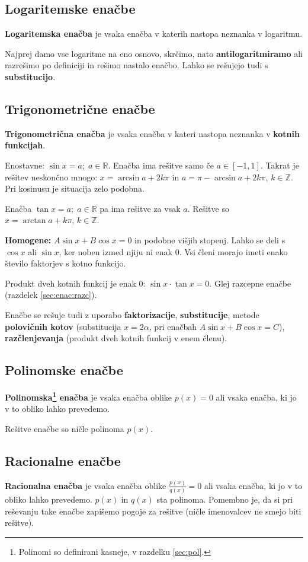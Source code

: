 \documentclass[a4paper,oneside,12pt,fleqn]{article}
\def\R{\ensuremath{\mathbb R}}
\def\Z{\ensuremath{\mathbb Z}}
\newcommand\krat\cdot
\def\kos{\cos}
\numberwithin{equation}{section}
\begin{document}
\subsection{Logaritemske enačbe}
\label{sec:enac:log}
\textbf{Logaritemska enačba} je vsaka enačba v katerih nastopa neznanka v logaritmu.

Najprej damo vse logaritme na eno osnovo, skrčimo, nato \textbf{antilogaritmiramo} ali razrešimo po
definiciji in rešimo nastalo enačbo. Lahko se rešujejo tudi s \textbf{substitucijo}.

\subsection{Trigonometrične enačbe}
\label{sec:enac:trig}
\textbf{Trigonometrična enačba} je vsaka enačba v kateri nastopa neznanka v \textbf{kotnih funkcijah}.

Enostavne: $\sin x = a; \; a \in \R$. 
Enačba ima rešitve samo če $a \in [-1,1]$. Takrat je rešitev neskončno mnogo:
$x = \arcsin a + 2k\pi$ in $a = \pi - \arcsin a + 2k\pi,\, k \in \Z$. Pri kosinusu je situacija zelo
podobna.

Enačba $\tan x = a; \; a \in \R$ pa ima rešitve za vsak $a$. Rešitve so $x = \arctan a + k\pi, \, k
\in \Z$.


\textbf{Homogene:} $A\sin x + B\kos x = 0$ in podobne višjih stopenj. Lahko se deli s $\kos x$ ali
$\sin x$, ker noben izmed njiju ni enak 0. Vsi členi morajo imeti enako število faktorjev
s kotno funkcijo.

Produkt dveh kotnih funkcij je enak 0: $\sin x \krat \tan x = 0$. Glej razcepne enačbe
(razdelek \ref{sec:enac:razc}).

Enačbe se rešuje tudi z uporabo \textbf{faktorizacije}, \textbf{substitucije}, metode \textbf{polovičnih kotov}
(substitucija $x = 2\alpha$, pri enačbah $A\sin x + B\kos x = C$), \textbf{razčlenjevanja} (produkt
dveh kotnih funkcij v enem členu).

\subsection{Polinomske enačbe}
\label{sec:enac:pol}
\textbf{Polinomska\footnote{Polinomi so definirani kasneje, v razdelku \ref{sec:pol}.}
enačba} je vsaka enačba oblike $p(x) = 0$ ali vsaka enačba, ki jo v to obliko lahko prevedemo. 

Rešitve enačbe so ničle polinoma $p(x)$.

\subsection{Racionalne enačbe}
\label{sec:enac:rac}
\textbf{Racionalna enačba} je vsaka enačba oblike $\frac{p(x)}{q(x)} = 0$ ali vsaka enačba, ki jo
v to obliko lahko prevedemo. $p(x)$ in $q(x)$ sta polinoma.
Pomembno je, da si pri reševanju take enačbe zapišemo pogoje
za rešitve (ničle imenovalcev ne smejo biti rešitve).
\end{document}
